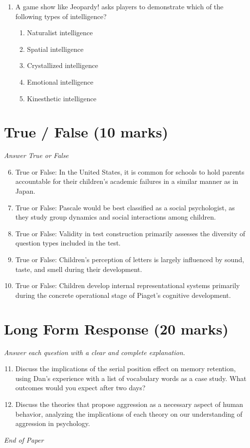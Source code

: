 \documentclass[12pt]{article}
\begin{document}
\begin{enumerate}[label=\arabic*.]
\begin{enumerate}[label=(\alph*)]
    \item nine
    \item ten
    \item eight
    \item one
\end{enumerate}
\item A game show like Jeopardy! asks players to demonstrate which of the following types of intelligence?
\begin{enumerate}[label=(\alph*)]
    \item Naturalist intelligence
    \item Spatial intelligence
    \item Crystallized intelligence
    \item Emotional intelligence
    \item Kinesthetic intelligence
\end{enumerate}
\end{enumerate}

\section*{True / False (10 marks)}
\textit{Answer True or False}
\begin{enumerate}[label=\arabic*.]
\setcounter{enumi}{5}
\item True or False: In the United States, it is common for schools to hold parents accountable for their children's academic failures in a similar manner as in Japan.
\item True or False: Pascale would be best classified as a social psychologist, as they study group dynamics and social interactions among children.
\item True or False: Validity in test construction primarily assesses the diversity of question types included in the test.
\item True or False: Children's perception of letters is largely influenced by sound, taste, and smell during their development.
\item True or False: Children develop internal representational systems primarily during the concrete operational stage of Piaget's cognitive development.
\end{enumerate}

\section*{Long Form Response (20 marks)}
\textit{Answer each question with a clear and complete explanation.}
\begin{enumerate}[label=\arabic*.]
\setcounter{enumi}{10}
\item Discuss the implications of the serial position effect on memory retention, using Dan's experience with a list of vocabulary words as a case study. What outcomes would you expect after two days?
\item Discuss the theories that propose aggression as a necessary aspect of human behavior, analyzing the implications of each theory on our understanding of aggression in psychology.
\end{enumerate}

\vfill
\noindent\textit{End of Paper}
\end{document}
